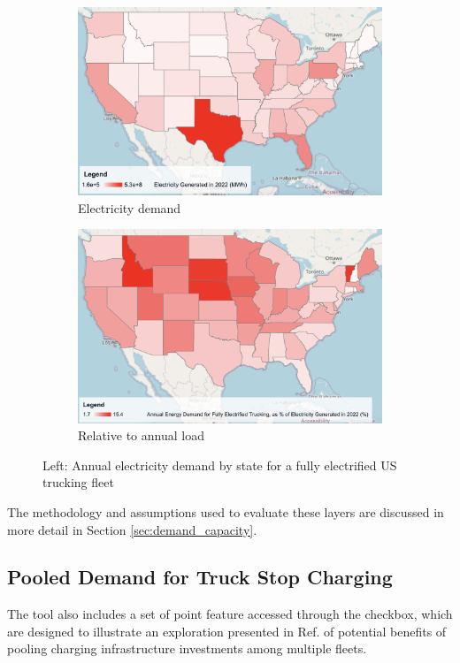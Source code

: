 \begin{figure}[ht]
    \centering
    \begin{subfigure}[b]{0.49\textwidth}
        \centering
        \includegraphics[width=\textwidth]{figures/ev_charging_demand.png}
        \caption{Electricity demand}
        \label{fig:ev_charging_demand}
    \end{subfigure}
    \hfill
    \begin{subfigure}[b]{0.49\textwidth}
        \centering
        \includegraphics[width=\textwidth]{figures/ev_charging_demand_rel_to_load.png}
        \caption{Relative to annual load}
        \label{fig:ev_charging_demand_rel_to_load}
    \end{subfigure}
    \caption{Left: Annual electricity demand by state for a fully electrified US trucking fleet}
    \label{fig:ev_charging_demand_load}
\end{figure}

The methodology and assumptions used to evaluate these layers are discussed in more detail in Section \ref{sec:demand_capacity}.

\subsection{Pooled Demand for Truck Stop Charging}

The tool also includes a set of point feature accessed through the  checkbox, which are designed to illustrate an exploration presented in Ref. \cite{MacDonell_2024} of potential benefits of pooling charging infrastructure investments among multiple fleets.